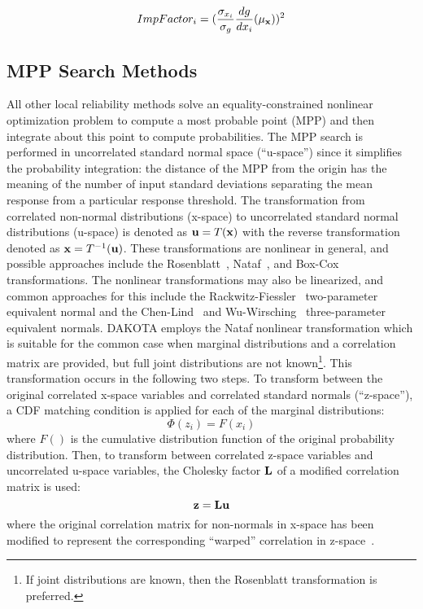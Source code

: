 \begin{equation}
ImpFactor_i  = ({\frac{\sigma_{x_{i}}}{\sigma_g}}{\frac{dg}{dx_i}(\mu_{\bf x})})^2
\end{equation}


\subsection{MPP Search Methods}\label{uq:reliability:local:mpp}

All other local reliability methods solve an equality-constrained nonlinear
optimization problem to compute a most probable point (MPP) and then
integrate about this point to compute probabilities.  The MPP search
is performed in uncorrelated standard normal space (``u-space'') since
it simplifies the probability integration: the distance of the MPP
from the origin has the meaning of the number of input standard
deviations separating the mean response from a particular response
threshold.  The transformation from correlated non-normal
distributions (x-space) to uncorrelated standard normal distributions
(u-space) is denoted as ${\bf u} = T({\bf x})$ with the reverse
transformation denoted as ${\bf x} = T^{-1}({\bf u})$.  These
transformations are nonlinear in general, and possible approaches
include the Rosenblatt~\cite{Ros52}, Nataf~\cite{Der86}, and
Box-Cox~\cite{Box64} transformations.  The nonlinear transformations
may also be linearized, and common approaches for this include the
Rackwitz-Fiessler~\cite{Rac78} two-parameter equivalent normal and the
Chen-Lind~\cite{Che83} and Wu-Wirsching~\cite{Wu87} three-parameter
equivalent normals.  DAKOTA employs the Nataf nonlinear transformation
which is suitable for the common case when marginal distributions and
a correlation matrix are provided, but full joint distributions are
not known\footnote{If joint distributions are known, then the
Rosenblatt transformation is preferred.}.  This transformation occurs 
in the following two steps.  To transform between the
original correlated x-space variables and correlated standard normals
(``z-space''), a CDF matching condition is applied for each of the
marginal distributions:
\begin{equation}
\Phi(z_i) = F(x_i) \label{eq:trans_zx}
\end{equation}
where $F()$ is the cumulative distribution function of the original
probability distribution.  Then, to transform between correlated
z-space variables and uncorrelated u-space variables, the Cholesky 
factor ${\bf L}$ of a modified correlation matrix is used:
\begin{equation}
{\bf z} = {\bf L} {\bf u} \label{eq:trans_zu}
\end{equation}
where the original correlation matrix for non-normals in x-space has
been modified to represent the corresponding ``warped'' correlation in 
z-space~\cite{Der86}.

